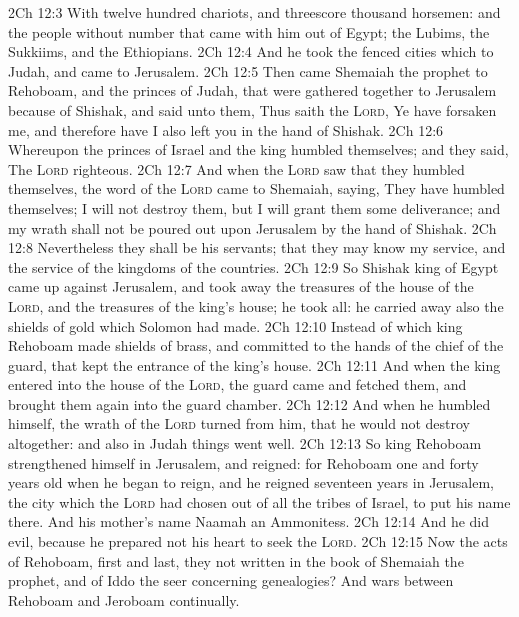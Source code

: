 \vs 2Ch 12:3 With twelve hundred chariots, and threescore thousand horsemen: and the people  without number that came with him out of Egypt; the Lubims, the Sukkiims, and the Ethiopians.
\vs 2Ch 12:4 And he took the fenced cities which  to Judah, and came to Jerusalem.
\vs 2Ch 12:5 Then came Shemaiah the prophet to Rehoboam, and  the princes of Judah, that were gathered together to Jerusalem because of Shishak, and said unto them, Thus saith the \textsc{Lord}, Ye have forsaken me, and therefore have I also left you in the hand of Shishak.
\vs 2Ch 12:6 Whereupon the princes of Israel and the king humbled themselves; and they said, The \textsc{Lord}  righteous.
\vs 2Ch 12:7 And when the \textsc{Lord} saw that they humbled themselves, the word of the \textsc{Lord} came to Shemaiah, saying, They have humbled themselves;  I will not destroy them, but I will grant them some deliverance; and my wrath shall not be poured out upon Jerusalem by the hand of Shishak.
\vs 2Ch 12:8 Nevertheless they shall be his servants; that they may know my service, and the service of the kingdoms of the countries.
\vs 2Ch 12:9 So Shishak king of Egypt came up against Jerusalem, and took away the treasures of the house of the \textsc{Lord}, and the treasures of the king's house; he took all: he carried away also the shields of gold which Solomon had made.
\vs 2Ch 12:10 Instead of which king Rehoboam made shields of brass, and committed  to the hands of the chief of the guard, that kept the entrance of the king's house.
\vs 2Ch 12:11 And when the king entered into the house of the \textsc{Lord}, the guard came and fetched them, and brought them again into the guard chamber.
\vs 2Ch 12:12 And when he humbled himself, the wrath of the \textsc{Lord} turned from him, that he would not destroy  altogether: and also in Judah things went well.
\vs 2Ch 12:13 So king Rehoboam strengthened himself in Jerusalem, and reigned: for Rehoboam  one and forty years old when he began to reign, and he reigned seventeen years in Jerusalem, the city which the \textsc{Lord} had chosen out of all the tribes of Israel, to put his name there. And his mother's name  Naamah an Ammonitess.
\vs 2Ch 12:14 And he did evil, because he prepared not his heart to seek the \textsc{Lord}.
\vs 2Ch 12:15 Now the acts of Rehoboam, first and last,  they not written in the book of Shemaiah the prophet, and of Iddo the seer concerning genealogies? And  wars between Rehoboam and Jeroboam continually.
